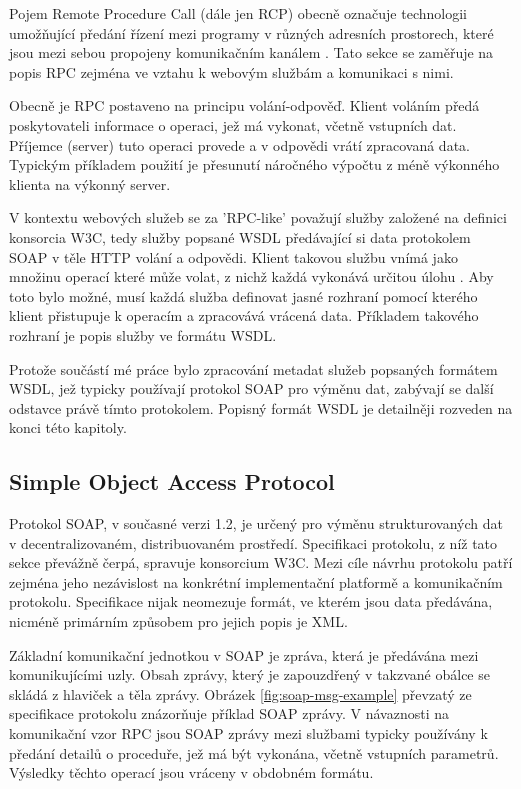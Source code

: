 \documentclass[czech,DP]{thesiskiv}
\begin{document}
Pojem Remote Procedure Call (dále jen RCP) obecně označuje technologii umožňující předání řízení mezi programy v různých adresních prostorech, které jsou mezi sebou propojeny komunikačním kanálem \cite{rpcThesis}. Tato sekce se zaměřuje na popis RPC zejména ve vztahu k webovým službám a komunikaci s nimi.

Obecně je RPC postaveno na principu volání-odpověď. Klient voláním předá poskytovateli informace o operaci, jež má vykonat, včetně vstupních dat. Příjemce (server) tuto operaci provede a v odpovědi vrátí zpracovaná data. Typickým příkladem použití je přesunutí náročného výpočtu z méně výkonného klienta na výkonný server.

V kontextu webových služeb se za 'RPC-like' považují služby založené na definici konsorcia W3C, tedy služby popsané WSDL předávající si data protokolem SOAP v těle HTTP volání a odpovědi. Klient takovou službu vnímá jako množinu operací které může volat, z nichž každá vykonává určitou úlohu \cite{rpcVsRest}. Aby toto bylo možné, musí každá služba definovat jasné rozhraní pomocí kterého klient přistupuje k operacím a zpracovává vrácená data. Příkladem takového rozhraní je popis služby ve formátu WSDL. 

Protože součástí mé práce bylo zpracování metadat služeb popsaných formátem WSDL, jež typicky používají protokol SOAP pro výměnu dat, zabývají se další odstavce právě tímto protokolem. Popisný formát WSDL je detailněji rozveden na konci této kapitoly.

\subsection{Simple Object Access Protocol} 


Protokol SOAP, v současné verzi 1.2, je určený pro výměnu strukturovaných dat v decentralizovaném, distribuovaném prostředí. Specifikaci protokolu\cite{soap12}, z níž tato sekce převážně čerpá, spravuje konsorcium W3C. Mezi cíle návrhu protokolu patří zejména jeho nezávislost na konkrétní implementační platformě a komunikačním protokolu\cite{soap12}. Specifikace nijak neomezuje formát, ve kterém jsou data předávána, nicméně primárním způsobem pro jejich popis je XML.

Základní komunikační jednotkou v SOAP je zpráva, která je předávána mezi komunikujícími uzly. Obsah zprávy, který je zapouzdřený v takzvané obálce se skládá z hlaviček a těla zprávy. Obrázek \ref{fig:soap-msg-example} převzatý ze specifikace protokolu znázorňuje příklad SOAP zprávy. V návaznosti na komunikační vzor RPC jsou SOAP zprávy mezi službami typicky používány k předání detailů o proceduře, jež má být vykonána, včetně vstupních parametrů. Výsledky těchto operací jsou vráceny v obdobném formátu.
\end{document}
